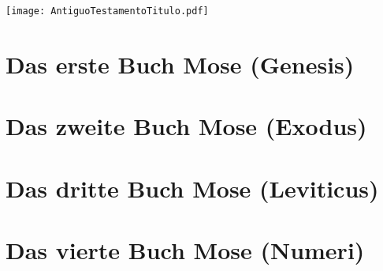 
\titleformat{\section}[hang]{\bfseries\huge}{}{0ex}{}[]

\titleformat{\section}[wrap]{\bfseries\huge}{}{0ex}{}[]
\newpage

\tableofcontents
\newpage

\null\vfill
\begin{center}
\begin{minipage}[c]{\textwidth}
  \begin{center}
  \texttt{[image: AntiguoTestamentoTitulo.pdf]}
  \end{center}
\end{minipage}
\end{center}
\null\vfill
\newpage

\pagestyle{bible}

\renewcommand{\cleardoublepage}{\clearpage}

\chapter{Das erste Buch Mose (Genesis)}
\begin{multicols}{2}
  \raggedcolumns
  \parskip=0pt \relax
  
\end{multicols}

\chapter{Das zweite Buch Mose (Exodus)}
\begin{multicols}{2}
  \raggedcolumns
  \parskip=0pt \relax
  
\end{multicols}

\chapter{Das dritte Buch Mose (Leviticus)}
\begin{multicols}{2}
  \raggedcolumns
  \parskip=0pt \relax
  
\end{multicols}

\chapter{Das vierte Buch Mose (Numeri)}
\begin{multicols}{2}
  \raggedcolumns
  \parskip=0pt \relax
  
\end{multicols}

